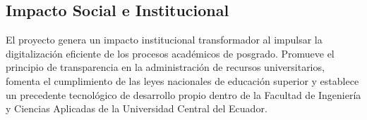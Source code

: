 \subsection{Impacto Social e Institucional}

El proyecto genera un impacto institucional transformador al impulsar la digitalización eficiente de los procesos académicos de posgrado. Promueve el principio de transparencia en la administración de recursos universitarios, fomenta el cumplimiento de las leyes nacionales de educación superior y establece un precedente tecnológico de desarrollo propio dentro de la Facultad de Ingeniería y Ciencias Aplicadas de la Universidad Central del Ecuador.
